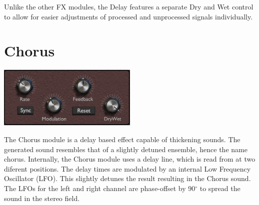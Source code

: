 
Unlike the other FX modules, the Delay features a separate Dry and Wet control to allow for easier adjustments of processed and unprocessed signals individually.


\section{Chorus}
\begin{center}
    \includegraphics[width=0.5\textwidth]{graphics/chorus.png}
\end{center}

The Chorus module is a delay based effect capable of thickening sounds. The generated sound resembles that of a slightly detuned ensemble, hence the name chorus. Internally, the Chorus module uses a delay line, which is read from at two diferent positions. The delay times are modulated by an internal Low Frequency Oscillator (LFO). This slightly detunes the result resulting in the Chorus sound. The LFOs for the left and right channel are phase-offset by 90$^{\circ}$ to spread the sound in the stereo field.



